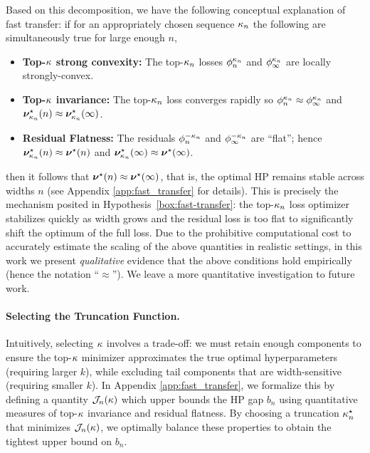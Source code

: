 Based on this decomposition, we have the following conceptual explanation of fast transfer: if for an appropriately chosen sequence $\kappa_n$ the following are simultaneously true for large enough $n$, 
\begin{itemize}[leftmargin=*]
    \item \textbf{Top-$\kappa$ strong convexity:} The top-$\kappa_n$ losses $\phi_n^{\kappa_n}$ and $\phi_\infty^{\kappa_n}$ are locally strongly-convex.
    \item \textbf{Top-$\kappa$ invariance:} The top-$\kappa_n$ loss converges rapidly so $\phi_n^{\kappa_n} \approx \phi_\infty^{\kappa_n}$ and $\bm{\nu}^\star_{\kappa_n}(n) \approx \bm{\nu}^\star_{\kappa_n}(\infty)$.
    \item \textbf{Residual Flatness:} The residuals $\phi_n^{-\kappa_n}$ and $\phi_\infty^{-\kappa_n}$ are ``flat''; hence $\bm{\nu}_{\kappa_n}^\star(n) \approx \bm{\nu}^\star(n)$ and $\bm{\nu}_{\kappa_n}^\star(\infty) \approx \bm{\nu}^\star(\infty)$.
\end{itemize}
then it follows that $\bm{\nu}^\star(n) \approx \bm{\nu}^\star(\infty)$, that is, the optimal HP remains stable across widths $n$ (see Appendix \ref{app:fast_transfer} for details). This is precisely the mechanism posited in Hypothesis~\ref{box:fast-transfer}: the top-$\kappa_n$ loss optimizer stabilizes quickly as width grows and the residual loss is too flat to significantly shift the optimum of the full loss. Due to the prohibitive computational cost to accurately estimate the scaling of the above quantities in realistic settings, in this work we present \textit{qualitative} evidence that the above conditions hold empirically (hence the notation ``$\approx$''). We leave a more quantitative investigation to future work. 

\paragraph{Selecting the Truncation Function.}
Intuitively, selecting $\kappa$ involves a trade-off: we must retain enough components to ensure the top-$\kappa$ minimizer approximates the true optimal hyperparameters (requiring larger $k$), while excluding tail components that are width-sensitive (requiring smaller $k$). In Appendix \ref{app:fast_transfer}, we formalize this by defining a quantity $\mathcal{J}_n(\kappa)$ which upper bounds the HP gap $b_n$ using quantitative measures of top-$\kappa$ invariance and residual flatness. By choosing a truncation $\kappa_n^\star$ that minimizes $\mathcal{J}_n(\kappa)$, we optimally balance these properties to obtain the tightest upper bound on $b_n$. 

